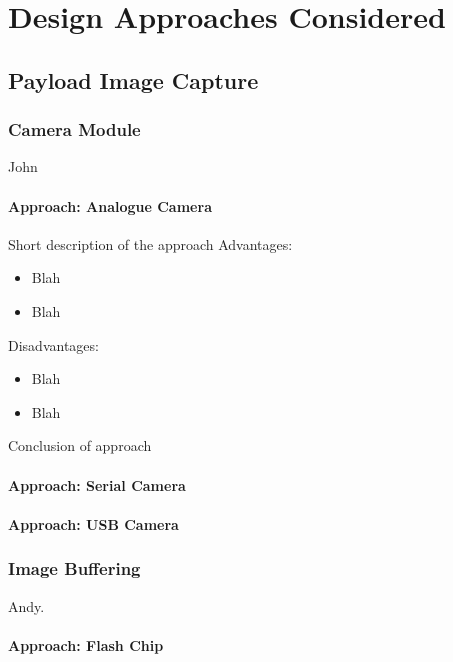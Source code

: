 \chapter{Design Approaches Considered}

\section{Payload Image Capture}

\subsection{Camera Module}
John

\subsubsection{Approach: Analogue Camera}	
Short description of the approach
Advantages:
\begin{itemize}
\item Blah
\item Blah
\end{itemize}

Disadvantages:
\begin{itemize}
\item Blah
\item Blah
\end{itemize}

Conclusion of approach


\subsubsection{Approach: Serial Camera}

\subsubsection{Approach: USB Camera}


\subsection{Image Buffering}
Andy.


\subsubsection{Approach: Flash Chip}

